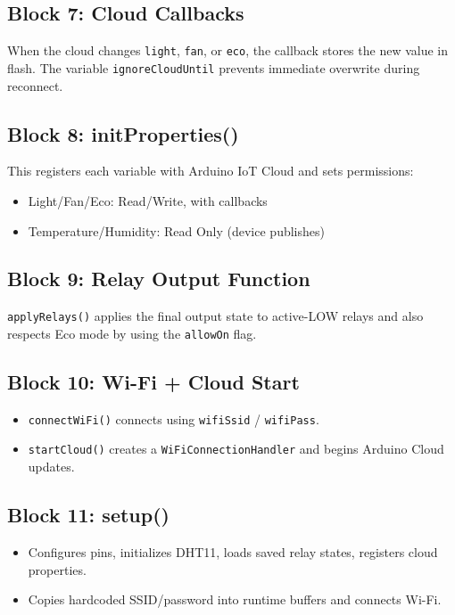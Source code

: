 \documentclass[12pt,a4paper]{article}
\begin{document}
\subsection{Block 7: Cloud Callbacks}
When the cloud changes \texttt{light}, \texttt{fan}, or \texttt{eco}, the callback stores the new value in flash. The variable \texttt{ignoreCloudUntil} prevents immediate overwrite during reconnect.

\subsection{Block 8: initProperties()}
This registers each variable with Arduino IoT Cloud and sets permissions:
\begin{itemize}
\item Light/Fan/Eco: Read/Write, with callbacks
\item Temperature/Humidity: Read Only (device publishes)
\end{itemize}

\subsection{Block 9: Relay Output Function}
\texttt{applyRelays()} applies the final output state to active-LOW relays and also respects Eco mode by using the \texttt{allowOn} flag.

\subsection{Block 10: Wi-Fi + Cloud Start}
\begin{itemize}
\item \texttt{connectWiFi()} connects using \texttt{wifiSsid} / \texttt{wifiPass}.
\item \texttt{startCloud()} creates a \texttt{WiFiConnectionHandler} and begins Arduino Cloud updates.
\end{itemize}

\subsection{Block 11: setup()}
\begin{itemize}
\item Configures pins, initializes DHT11, loads saved relay states, registers cloud properties.
\item Copies hardcoded SSID/password into runtime buffers and connects Wi-Fi.
\end{itemize}
\end{document}
